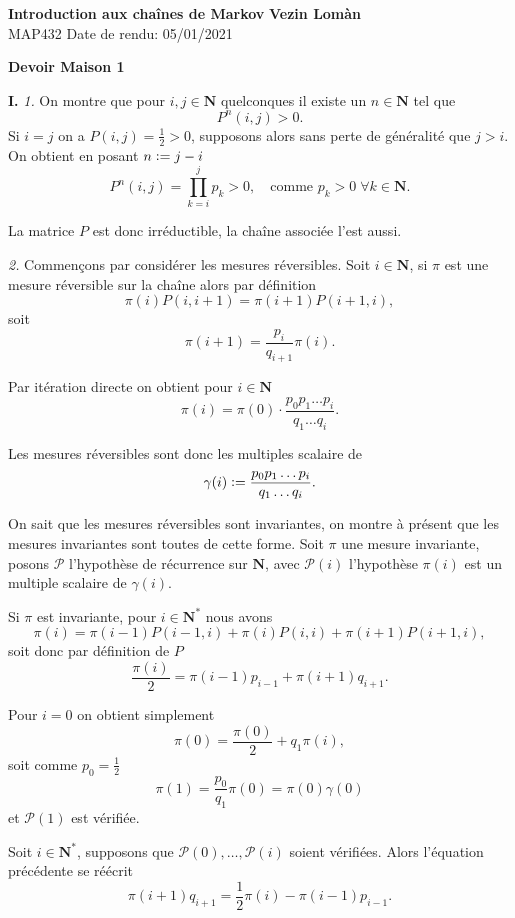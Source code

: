 \documentclass[12pt]{article}
\newcommand{\defeq}{\vcentcolon=}
\newcommand{\N}{\mathbf{N}}
\begin{document}
        \noindent
\textbf{Introduction aux chaînes de Markov} \hfill \textbf{Vezin Lomàn}\\
\normalsize MAP432 \hfill Date de rendu: 05/01/2021\\

\begin{center}
\textbf{Devoir Maison 1}
\end{center}

\textbf{I.} \textit{1.} On montre que pour $i, j \in \N$ quelconques il existe un $n \in \N$ tel que \[
        P^{n}(i,j) > 0
.\] 
Si $i = j$ on a  $P(i,j) = \frac{1}{2} > 0$, supposons alors sans perte de généralité que $j > i$. On obtient en posant $n \defeq j - i$ \[
        P^{n}(i, j) = \prod_{k=i}^{j}p_{k} > 0, \quad \text{comme } p_{k} > 0 \; \forall k \in \N
.\] 

La matrice $P$ est donc irréductible, la chaîne associée l'est aussi.
        
\medskip

\textit{2.} Commençons par considérer les mesures réversibles. Soit $i \in \N$, si $\pi$ est une mesure réversible sur la chaîne alors par définition  \[
        \pi(i)P(i,i+1) = \pi(i+1)P(i+1,i)
,\] soit \[
\pi(i+1) = \frac{p_{i}}{q_{i+1}}\pi(i)
.\]  

Par itération directe on obtient pour $i \in \N$\[
        \pi(i) = \pi(0)\cdot\frac{p_{0}p_{1}\ldots p_{i}}{q_{1}\ldots q_{i}}
.\] 

Les mesures réversibles sont donc les multiples scalaire de \[
        \gamma(i) \defeq \frac{p_{0}p_{1}\ldots p_{i}}{q_{1}\ldots q_{i}}
.\] 

On sait que les mesures réversibles sont invariantes, on montre à présent que les mesures invariantes sont toutes de cette forme. Soit $\pi$ une mesure invariante, posons $\mathcal{P}$ l'hypothèse de récurrence sur $\N$, avec $\mathcal{P}(i)$ l'hypothèse $\pi(i)$ est un multiple scalaire de $\gamma(i)$.

Si $\pi$ est invariante, pour $i \in \N^{*}$ nous avons \[
        \pi(i) = \pi(i-1)P(i-1,i) + \pi(i)P(i,i) + \pi(i+1)P(i+1,i)
,\] soit donc par définition de $P$  \[
\frac{\pi(i)}{2} = \pi(i-1)p_{i-1} + \pi(i+1)q_{i+1}
.\]  

Pour $i = 0$ on obtient simplement \[
        \pi(0) = \frac{\pi(0)}{2} + q_{1}\pi(i)
,\] soit comme $p_{0} = \frac{1}{2}$ \[
\pi(1) = \frac{p_{0}}{q_{1}}\pi(0) = \pi(0)\gamma(0)
\] et $\mathcal{P}(1)$ est vérifiée.

Soit $i\in \N^{*}$, supposons que $\mathcal{P}(0), \ldots, \mathcal{P}(i)$ soient vérifiées. Alors l'équation précédente se réécrit \[
        \pi(i+1)q_{i+1} = \frac{1}{2}\pi(i) - \pi(i-1)p_{i-1}
.\] 
\end{document}
